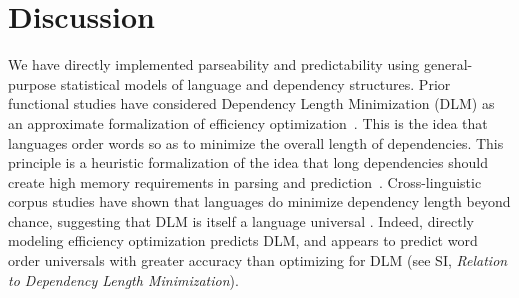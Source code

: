 \documentclass[9pt,twocolumn,twoside,lineno]{pnas-new}
\begin{document}
%



\section{Discussion}

We have directly implemented parseability and predictability using general-purpose statistical models of language and dependency structures.
Prior functional studies have considered Dependency Length Minimization (DLM) as an approximate formalization of efficiency optimization~\cite{futrell2015largescale,liu2017dependency,temperley2018minimizing}.
This is the idea that languages order words so as to minimize the overall length of dependencies.
This principle is a heuristic formalization of the idea that long dependencies should create high memory requirements in parsing and prediction~\cite{hawkins1994performance,gibson1998linguistic,gibson2000dependency, futrell2017memory}.
Cross-linguistic corpus studies have shown that languages do minimize dependency length beyond chance, suggesting that DLM is itself a language universal \cite{futrell2015largescale,liu2017dependency,temperley2018minimizing}.
Indeed, directly modeling efficiency optimization predicts DLM, and appears to predict word order universals with greater accuracy than optimizing for DLM (see SI, \emph{Relation to Dependency Length Minimization}).
\end{document}
